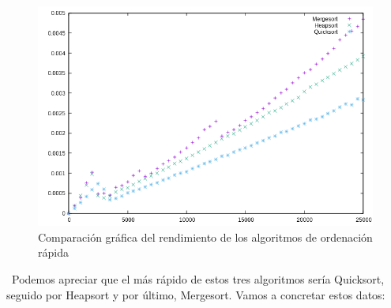 \documentclass{article}
\begin{document}
		\begin{center}
		\end{center}
		\begin{figure}[H]
		\centering
		\includegraphics[totalheight=8cm]{img/ordenacion_rapida}
		\caption{Comparación gráfica del rendimiento de los algoritmos de ordenación rápida}
		\label{fig:ordenacion_rapida}
		\end{figure}
		\
		Podemos apreciar que el más rápido de estos tres algoritmos sería Quicksort, seguido por Heapsort y por último, Mergesort. Vamos a concretar estos datos:
		\
\end{document}
